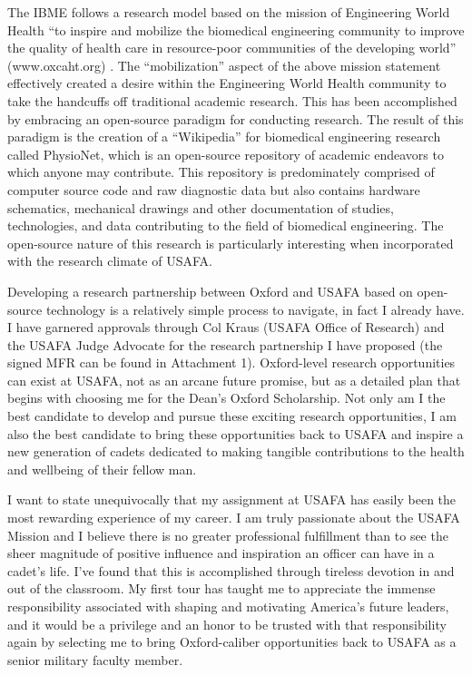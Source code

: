 \documentclass{article}
\begin{document}
The IBME follows a research model based on the mission of Engineering World
Health “to inspire and mobilize the biomedical engineering community to improve
the quality of health care in resource-poor communities of the developing
world” (www.oxcaht.org) . The “mobilization” aspect of the above mission
statement effectively created a desire within the Engineering World Health
community to take the handcuffs off traditional academic research. This has
been accomplished by embracing an open-source paradigm for conducting research.
The result of this paradigm is the creation of a “Wikipedia” for biomedical
engineering research called PhysioNet, which is an open-source repository of
academic endeavors to which anyone may contribute. This repository is
predominately comprised of computer source code and raw diagnostic data but
also contains hardware schematics, mechanical drawings and other documentation
of studies, technologies, and data contributing to the field of biomedical
engineering. The open-source nature of this research is particularly
interesting when incorporated with the research climate of USAFA.
 
Developing a research partnership between Oxford and USAFA based on open-source
technology is a relatively simple process to navigate, in fact I already have.
I have garnered approvals through Col Kraus (USAFA Office of Research) and the
USAFA Judge Advocate for the research partnership I have proposed (the signed
MFR can be found in Attachment 1). Oxford-level research opportunities can
exist at USAFA, not as an arcane future promise, but as a detailed plan that
begins with choosing me for the Dean’s Oxford Scholarship. Not only am I the
best candidate to develop and pursue these exciting research opportunities, I
am also the best candidate to bring these opportunities back to USAFA and
inspire a new generation of cadets dedicated to making tangible contributions
to the health and wellbeing of their fellow man.
 
I want to state unequivocally that my assignment at USAFA has easily been the
most rewarding experience of my career. I am truly passionate about the USAFA
Mission and I believe there is no greater professional fulfillment than to see
the sheer magnitude of positive influence and inspiration an officer can have
in a cadet’s life. I’ve found that this is accomplished through tireless
devotion in and out of the classroom. My first tour has taught me to appreciate
the immense responsibility associated with shaping and motivating America’s
future leaders, and it would be a privilege and an honor to be trusted with
that responsibility again by selecting me to bring Oxford-caliber opportunities
back to USAFA as a senior military faculty member.
 
\end{document}

